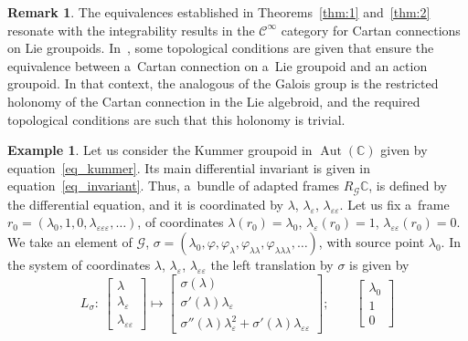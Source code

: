 \documentclass[pdftex]{sigma}
\numberwithin{equation}{section}
\theoremstyle{definition}
\newtheorem{Example}[Theorem]{Example}
\newtheorem{Remark}[Theorem]{Remark}
\begin{document}
\begin{Remark}
 The equivalences established in Theorems~\ref{thm:1} and~\ref{thm:2} resonate with the integrability results in the $\mathscr C^{\infty}$ category for Cartan connections on Lie groupoids. In~\cite[Corollary~3.12]{crainic2003integrability}, some topological conditions are given that ensure the equivalence between a~Cartan connection on a~Lie groupoid and an action groupoid. In that context, the analogous of the Galois group is the restricted holonomy of the Cartan connection in the Lie algebroid, and the required topological conditions are such that this holonomy is trivial.
\end{Remark}

\begin{Example}
Let us consider the Kummer groupoid in $\operatorname{Aut}(\mathbb C)$ given by equation~\eqref{eq_kummer}. Its main differential invariant is given in equation~\eqref{eq_invariant}. Thus, a~bundle of adapted frames $R_{\mathcal G}\mathbb C$, is defined by the differential equation,
and it is coordinated by $\lambda$, $\lambda_{\varepsilon}$, $\lambda_{\varepsilon\varepsilon}$. Let us fix a~frame $r_0 = (\lambda_0,1,0, \lambda_{\varepsilon\varepsilon\varepsilon},\dots)$, of coordinates $\lambda(r_0) = \lambda_0$, $\lambda_\varepsilon(r_0) = 1$, $\lambda_{\varepsilon\varepsilon}(r_0) = 0$. We take an element of $\mathcal G$, $\sigma = (\lambda_0, \varphi, \varphi_\lambda, \varphi_{\lambda\lambda}, \varphi_{\lambda\lambda\lambda}, \dots)$, with source point $\lambda_0$. In the system of coordinates $\lambda$, $\lambda_\varepsilon$, $\lambda_{\varepsilon\varepsilon}$ the left translation by $\sigma$ is given by
\[L_{\sigma} \colon\
\begin{bmatrix}
\lambda \\ \lambda_\varepsilon \\ \lambda_{\varepsilon\varepsilon}
\end{bmatrix}
\mapsto
\begin{bmatrix}
\sigma(\lambda) \\ \sigma'(\lambda)\lambda_\varepsilon \\ \sigma''(\lambda)\lambda_\varepsilon^2 + \sigma'(\lambda)\lambda_{\varepsilon\varepsilon}
\end{bmatrix}; \qquad
\begin{bmatrix}
\lambda_0 \\ 1 \\ 0

\end{bmatrix}\]
\end{Example}
\end{document}
